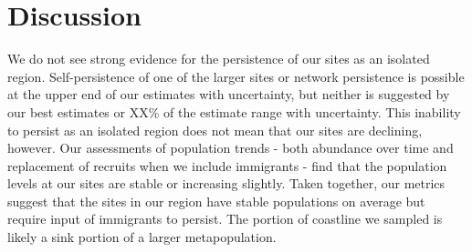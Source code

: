\documentclass[12pt, oneside]{article}   	%
\begin{document}



\section*{Discussion}
We do not see strong evidence for the persistence of our sites as an isolated region. Self-persistence of one of the larger sites or network persistence is possible at the upper end of our estimates with uncertainty, but neither is suggested by our best estimates or XX\% of the estimate range with uncertainty. This inability to persist as an isolated region does not mean that our sites are declining, however. Our assessments of population trends - both abundance over time and replacement of recruits when we include immigrants - find that the population levels at our sites are stable or increasing slightly. Taken together, our metrics suggest that the sites in our region have stable populations on average but require input of immigrants to persist. The portion of coastline we sampled is likely a sink portion of a larger metapopulation.
\end{document}
